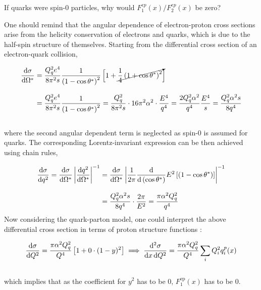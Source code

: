 \begin{problem}{8.4}
    If quarks were spin-0 particles, why would $F^{ep}_1(x)/F^{ep}_2(x)$ be zero?
\end{problem}
\begin{solution}
One should remind that the angular dependence of electron-proton cross sections arise from the helicity conservation of electrons and quarks, which is due to the half-spin structure of themselves. Starting from the differential cross section of an electron-quark collision,

    \begin{align*}
        \frac{\mathop{}\!\mathrm{d} \sigma}{ \mathop{}\!\mathrm{d} \Omega^\ast} &= \frac{Q_q^2 e^4}{8\pi^2 s}  \frac{1}{\left( 1-\cos\theta^\ast \right)^2} \left[ 1 + \cancelto{}{\frac{1}{4}\left( 1+ \cos\theta^\ast \right)^2 }\right]  \\[0.12in]
        &= \frac{Q_q^2 e^4}{8\pi^2 s}   \frac{1}{\left( 1-\cos\theta^\ast \right)^2} = \frac{Q_q^2 }{8\pi^2 s} \cdot 16\pi^2 \alpha^2 \cdot \frac{E^4}{q^4} = \frac{2Q_q^2 \alpha^2}{q^4} \frac{E^4}{s} = \frac{Q_q^2 \alpha^2s}{8 q^4} 
    \end{align*}\\
where the second angular dependent term is neglected as spin-0 is assumed for quarks. The corresponding Lorentz-invariant expression can be then achieved using chain rules, 

    \begin{align*}
        \frac{\dif \sigma}{\dif q^2} = \frac{\dif \sigma}{\dif \Omega^\ast} \left| \frac{\dif q^2}{\dif \Omega^\ast} \right|^{-1} &=  \frac{\dif \sigma}{\dif \Omega^\ast} \left| \frac{1}{2\pi} \frac{\dif}{\dif \left( \cos \theta^\ast \right)} E^2 \left[ \left( 1-\cos\theta^\ast \right) \right] \right|^{-1} \\[0.12in]
        &= \frac{Q_q^2 \alpha^2s}{8 q^4}  \cdot \frac{2\pi}{E^2} = \frac{\pi \alpha^2  Q_q^2 }{ q^4}\\
    \end{align*}    
Now considering the quark-parton model, one could interpret the above differential cross section in terms of proton structure functions :

    \begin{align*}
        \frac{\mathop{}\!\mathrm{d} \sigma}{\mathop{}\!\mathrm{d} Q^2} = \frac{\pi \alpha^2 Q_q^2}{Q^4} \left[ 1+0\cdot (1-y)^2 \right] \implies \frac{\mathop{}\!\mathrm{d}^2 \sigma}{\mathop{}\!\mathrm{d} x \mathop{}\!\mathrm{d} Q^2} = \frac{\pi \alpha^2 Q_q^2}{Q^4} \sum_i Q_i^2 q_i^p(x)
    \end{align*}\\
    which implies that as the coefficient for $y^2$ has to be $0$, $F_1^{\text{ep}}(x)$ has  to be 0. 
\end{solution}

